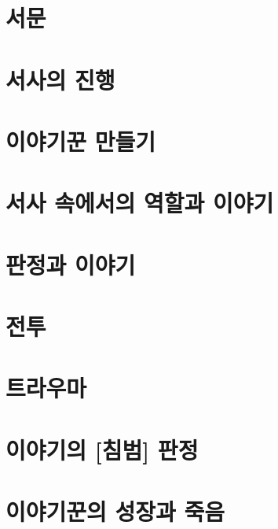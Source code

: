 \documentclass{report}
\begin{document}
	\parttoc
	
	\chapter{서문}
		
	
	\hypertarget{story-progression}{}
	\chapter{서사의 진행}
		
	
	\chapter{이야기꾼 만들기}
		
	
	\chapter{서사 속에서의 역할과 이야기}
		
	
	\chapter{판정과 이야기}
		
	
	\chapter{전투}
		
	
	\hypertarget{trauma}{}
	\chapter{트라우마}
		
	
	\hypertarget{intrusion}{}
	\chapter{이야기의 [침범] 판정}
		
	
	\hypertarget{growth}{}
	\chapter{이야기꾼의 성장과 죽음}
		
	
\end{document}
